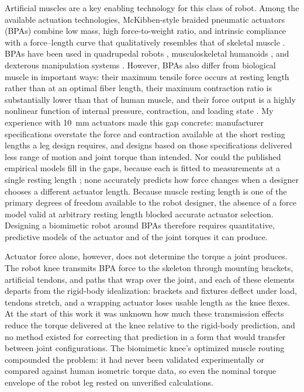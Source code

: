 Artificial muscles are a key enabling technology for this class of robot. Among the available actuation technologies, McKibben-style braided pneumatic actuators (BPAs) combine low mass, high force-to-weight ratio, and intrinsic compliance with a force--length curve that qualitatively resembles that of skeletal muscle \citep{liang_comparative_2020, hunt_modeling_2017}. BPAs have been used in quadrupedal robots \citep{aschenbeck_design_2006, hunt_modeling_2017, scharzenberger_design_2019}, musculoskeletal humanoids \citep{asano_design_2017, hitzmann_anthropomorphic_2018}, and dexterous manipulation systems \citep{chen_realizing_2019}. However, BPAs also differ from biological muscle in important ways: their maximum tensile force occurs at resting length rather than at an optimal fiber length, their maximum contraction ratio is substantially lower than that of human muscle, and their force output is a highly nonlinear function of internal pressure, contraction, and loading state \citep{hunt_modeling_2017, sarosi_comparative_2017, liang_comparative_2020}. My experience with \qty{10}{\mm} actuators made this gap concrete: manufacturer specifications overstate the force and contraction available at the short resting lengths a leg design requires, and designs based on those specifications delivered less range of motion and joint torque than intended. Nor could the published empirical models fill in the gaps, because each is fitted to measurements at a single resting length \citep{sarosi_comparative_2017, martens_modeling_2017, hunt_modeling_2017}; none accurately predicts how force changes when a designer chooses a different actuator length. Because muscle resting length is one of the primary degrees of freedom available to the robot designer, the absence of a force model valid at arbitrary resting length blocked accurate actuator selection. Designing a biomimetic robot around BPAs therefore requires quantitative, predictive models of the actuator and of the joint torques it can produce.

Actuator force alone, however, does not determine the torque a joint produces. The robot knee transmits BPA force to the skeleton through mounting brackets, artificial tendons, and paths that wrap over the joint, and each of these elements departs from the rigid-body idealization: brackets and fixtures deflect under load, tendons stretch, and a wrapping actuator loses usable length as the knee flexes. At the start of this work it was unknown how much these transmission effects reduce the torque delivered at the knee relative to the rigid-body prediction, and no method existed for correcting that prediction in a form that would transfer between joint configurations. The biomimetic knee's optimized muscle routing \citep{morrow_optimization_2020} compounded the problem: it had never been validated experimentally or compared against human isometric torque data, so even the nominal torque envelope of the robot leg rested on unverified calculations.


